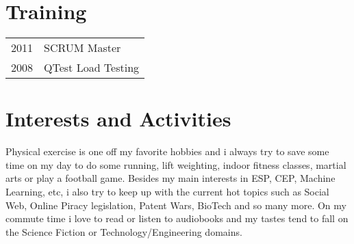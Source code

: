 \documentclass[a4paper,10pt]{article}
\begin{document}
\section{Training}
\begin{tabular}{rl}
 2011 & SCRUM Master  \\
 2008 & QTest Load Testing \\
\end{tabular}

\section{Interests and Activities}
Physical exercise is one off my favorite hobbies and i always try to save some time on my day to do some running, lift weighting, indoor fitness classes, martial arts or play a football game.
Besides my main interests in ESP, CEP, Machine Learning, etc, i also try to keep up with the current hot topics such as Social Web, Online Piracy legislation, Patent Wars, BioTech and so many more.
On my commute time i love to read or listen to audiobooks and my tastes tend to fall on the Science Fiction or Technology/Engineering domains.
\end{document}
